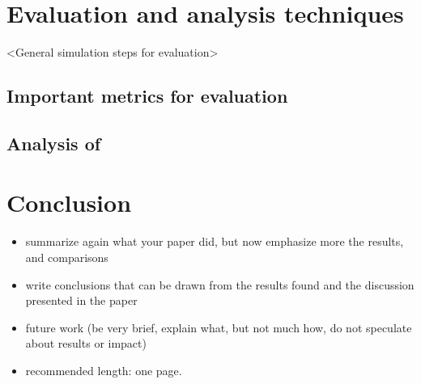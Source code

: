 \documentclass[]{ccs-thesis}
\begin{document}
\chapter{Evaluation and analysis techniques}
\label{sec:evaluation}

<General simulation steps for evaluation>

\section{Important metrics for evaluation}

\section{Analysis of}

\chapter{Conclusion}
\label{sec:conclusions}

\begin{itemize}
    \item summarize again what your paper did, but now emphasize more the results, and comparisons
    \item write conclusions that can be drawn from the results found and the discussion presented in the paper
    \item future work (be very brief, explain what, but not much how, do not speculate about results or impact)
    \item recommended length: one page.
\end{itemize}



\cleardoublepage

\listofabbreviations
\clearpage

\listoffigures
\clearpage

\listoftables
\clearpage

\printbibliography
\end{document}
